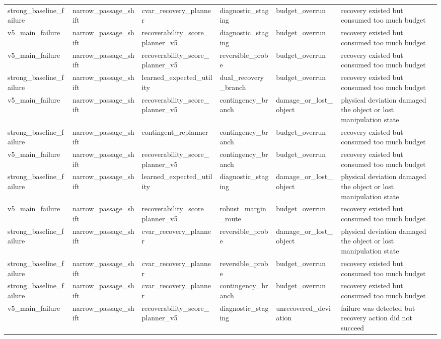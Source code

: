 \documentclass{article}
\begin{document}
\begin{center}
\begin{longtable}{p{0.15\linewidth}p{0.16\linewidth}p{0.18\linewidth}p{0.13\linewidth}p{0.15\linewidth}p{0.23\linewidth}}
strong\_baseline\_failure & narrow\_passage\_shift & cvar\_recovery\_planner & diagnostic\_staging & budget\_overrun & recovery existed but consumed too much budget\\
v5\_main\_failure & narrow\_passage\_shift & recoverability\_score\_planner\_v5 & diagnostic\_staging & budget\_overrun & recovery existed but consumed too much budget\\
v5\_main\_failure & narrow\_passage\_shift & recoverability\_score\_planner\_v5 & reversible\_probe & budget\_overrun & recovery existed but consumed too much budget\\
strong\_baseline\_failure & narrow\_passage\_shift & learned\_expected\_utility & dual\_recovery\_branch & budget\_overrun & recovery existed but consumed too much budget\\
v5\_main\_failure & narrow\_passage\_shift & recoverability\_score\_planner\_v5 & contingency\_branch & damage\_or\_lost\_object & physical deviation damaged the object or lost manipulation state\\
strong\_baseline\_failure & narrow\_passage\_shift & contingent\_replanner & contingency\_branch & budget\_overrun & recovery existed but consumed too much budget\\
v5\_main\_failure & narrow\_passage\_shift & recoverability\_score\_planner\_v5 & contingency\_branch & budget\_overrun & recovery existed but consumed too much budget\\
strong\_baseline\_failure & narrow\_passage\_shift & learned\_expected\_utility & diagnostic\_staging & damage\_or\_lost\_object & physical deviation damaged the object or lost manipulation state\\
v5\_main\_failure & narrow\_passage\_shift & recoverability\_score\_planner\_v5 & robust\_margin\_route & budget\_overrun & recovery existed but consumed too much budget\\
strong\_baseline\_failure & narrow\_passage\_shift & cvar\_recovery\_planner & reversible\_probe & damage\_or\_lost\_object & physical deviation damaged the object or lost manipulation state\\
strong\_baseline\_failure & narrow\_passage\_shift & cvar\_recovery\_planner & reversible\_probe & budget\_overrun & recovery existed but consumed too much budget\\
strong\_baseline\_failure & narrow\_passage\_shift & cvar\_recovery\_planner & contingency\_branch & budget\_overrun & recovery existed but consumed too much budget\\
v5\_main\_failure & narrow\_passage\_shift & recoverability\_score\_planner\_v5 & diagnostic\_staging & unrecovered\_deviation & failure was detected but recovery action did not succeed\\

\end{longtable}
\end{center}
\end{document}
